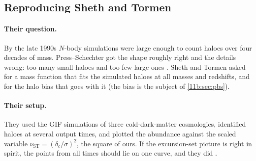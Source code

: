 \subsection{Reproducing Sheth and Tormen}
\label{11b:sec:st}

\paragraph{Their question.}
By the late 1990s $N$-body simulations were large enough to count haloes over
four decades of mass. Press--Schechter got the shape roughly right and the
details wrong: too many small haloes and too few large ones
. Sheth and Tormen \cite{ShethTormen1999} asked for
a mass function that fits the simulated haloes at all masses and redshifts, and
for the halo bias that goes with it (the bias is the subject of
\cref{11b:sec:pbs}).

\paragraph{Their setup.}
They used the GIF simulations of three cold-dark-matter cosmologies, identified
haloes at several output times, and plotted the abundance against the scaled
variable $\nu_{\mathrm{ST}}=(\delta_c/\sigma)^2$, the square of ours. If the
excursion-set picture is right in spirit, the points from all times should lie on
one curve, and they did .

